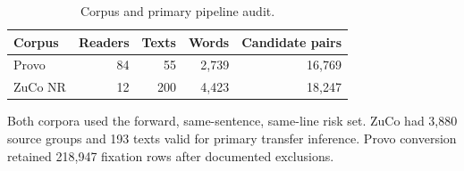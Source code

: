 \begin{table}[tbp]
\centering
\caption{Corpus and primary pipeline audit.}
\label{tab:corpora}
\begin{tabular}{lrrrr}
\toprule
Corpus & Readers & Texts & Words & Candidate pairs \\
\midrule
Provo & 84 & 55 & 2,739 & 16,769 \\
ZuCo NR & 12 & 200 & 4,423 & 18,247 \\
\bottomrule
\end{tabular}
\begin{minipage}{0.95\linewidth}\small
Both corpora used the forward, same-sentence, same-line risk set. ZuCo had 3,880 source groups and 193 texts valid for primary transfer inference. Provo conversion retained 218,947 fixation rows after documented exclusions.
\end{minipage}
\end{table}
